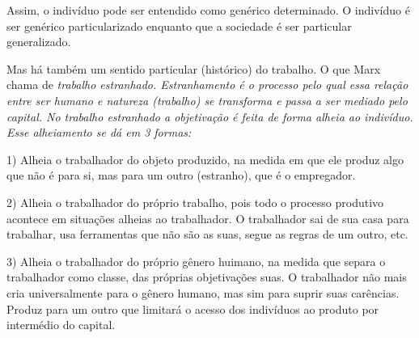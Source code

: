 \documentclass[12pt]{article}
\begin{document}
Assim, o indivíduo pode ser entendido como genérico determinado.
O indivíduo é ser genérico particularizado enquanto que a sociedade é ser particular generalizado.

Mas há também um sentido particular (histórico) do trabalho.
O que Marx chama de \em trabalho estranhado\em.
\em Estranhamento \em é o processo pelo qual essa relação entre ser humano e natureza (trabalho) se transforma e passa a ser mediado pelo capital.
No trabalho estranhado a objetivação é feita de forma alheia ao indivíduo.
Esse alheiamento se dá em 3 formas:

1) Alheia o trabalhador do objeto produzido, na medida em que ele produz algo que não é para si, mas para um outro (estranho), que é o empregador.

2) Alheia o trabalhador do próprio trabalho, pois todo o processo produtivo acontece em situações alheias ao trabalhador.
O trabalhador sai de sua casa para trabalhar, usa ferramentas que não são as suas, segue as regras de um outro, etc.

3) Alheia o trabalhador do próprio gênero huimano, na medida que separa o trabalhador como classe, das próprias objetivações suas. O trabalhador não mais cria universalmente para o gênero humano, mas sim para suprir suas carências. Produz para um outro que limitará o acesso dos indivíduos ao produto por intermédio do capital.
\end{document}
